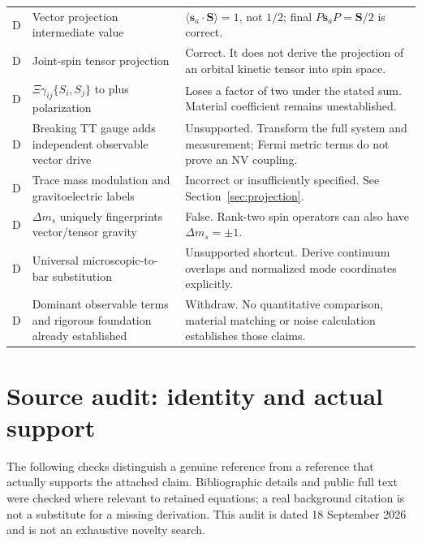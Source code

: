 \documentclass[a4paper,11pt]{article}
\begin{document}
\begin{longtable}{@{}P{10mm}P{54mm}P{89mm}@{}}
D & Vector projection intermediate value & $\langle\bm s_a\cdot\bm S\rangle=1$, not $1/2$; final $P\bm s_aP=\bm S/2$ is correct.\\
D & Joint-spin tensor projection & Correct. It does not derive the projection of an orbital kinetic tensor into spin space.\\
D & $\Xi\gamma_{ij}\{S_i,S_j\}$ to plus polarization & Loses a factor of two under the stated sum. Material coefficient remains unestablished.\\
D & Breaking TT gauge adds independent observable vector drive & Unsupported. Transform the full system and measurement; Fermi metric terms do not prove an NV coupling.\\
D & Trace mass modulation and gravitoelectric labels & Incorrect or insufficiently specified. See Section~\ref{sec:projection}.\\
D & $\Delta m_s$ uniquely fingerprints vector/tensor gravity & False. Rank-two spin operators can also have $\Delta m_s=\pm1$.\\
D & Universal microscopic-to-bar substitution & Unsupported shortcut. Derive continuum overlaps and normalized mode coordinates explicitly.\\
D & Dominant observable terms and rigorous foundation already established & Withdraw. No quantitative comparison, material matching or noise calculation establishes those claims.\\
\bottomrule\end{longtable}

\section{Source audit: identity and actual support}
\label{sec:sources}

The following checks distinguish a genuine reference from a reference that actually supports the attached claim. Bibliographic details and public full text were checked where relevant to retained equations; a real background citation is not a substitute for a missing derivation. This audit is dated 18 September 2026 and is not an exhaustive novelty search.
\end{document}
